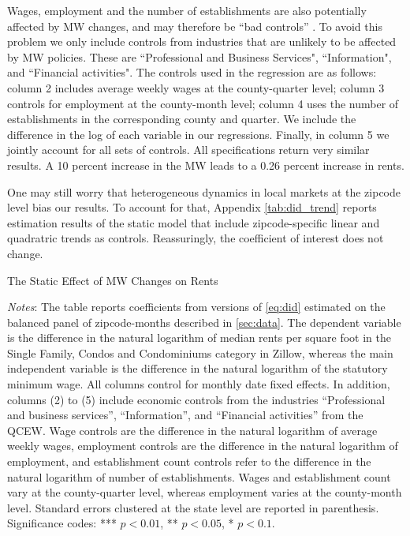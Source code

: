 Wages, employment and the number of establishments are also potentially affected by MW changes,
and may therefore be ``bad controls'' 
\parencite{AngristPischke2009}. To avoid this problem we only include controls from industries 
that are unlikely to be affected by MW policies. These are ``Professional and Business Services", 
``Information", and ``Financial activities". The controls used in the regression are as follows:
column 2 includes average weekly wages at the county-quarter level; column 3 controls for 
employment at the county-month level; column 4 uses the number of establishments in the 
corresponding county and quarter. We include the difference in the log of each variable in our
regressions. Finally, in column 5 we jointly account for all sets of controls. All specifications 
return very similar results. A 10 percent increase in the MW leads to a 0.26 percent increase 
in rents. 

One may still worry that heterogeneous dynamics in local markets at the zipcode level bias our 
results. To account for that, Appendix \autoref{tab:did_trend} reports estimation 
results of the static model that include zipcode-specific linear and quadratric trends as controls. 
Reassuringly, the coefficient of interest does not change.

\begin{table}[h!]
    \caption{The Static Effect of MW Changes on Rents}
    \label{tab:static_model}
    \centering
    
    \begin{minipage}{0.9\textwidth} \footnotesize
		\vspace{3mm} 
		\textit{Notes}: The table reports coefficients from versions of \autoref{eq:did} 
		estimated on the balanced panel of zipcode-months described in \autoref{sec:data}. 
		The dependent variable is the difference in the natural logarithm of median	rents 
		per square foot in the Single Family, Condos and Condominiums category in Zillow, 
		whereas the main independent variable is the difference in the natural logarithm of 
		the statutory minimum wage. All columns control for monthly date fixed effects. In 
		addition, columns (2) to (5) include economic controls from the industries 
		``Professional and business services'', ``Information'', and ``Financial activities'' 
		from the QCEW. Wage controls are the difference in the natural logarithm of average 
		weekly wages, employment controls are the difference in the natural logarithm of 
		employment, and establishment count controls refer to the difference in the natural 
		logarithm of number of establishments. Wages and establishment count vary at the 
		county-quarter level, whereas employment varies at the county-month level. 
		Standard errors clustered at the state level are reported in parenthesis. Significance 
		codes: *** $p < 0.01$, ** $p < 0.05$, * $p < 0.1$.
	\end{minipage}
\end{table}


